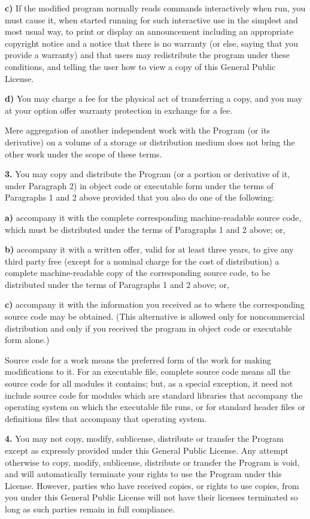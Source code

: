 \documentclass[]{article}
\begin{document}
\textbf{c)} If the modified program normally reads commands
interactively when run, you must cause it, when started running for such
interactive use in the simplest and most usual way, to print or display
an announcement including an appropriate copyright notice and a notice
that there is no warranty (or else, saying that you provide a warranty)
and that users may redistribute the program under these conditions, and
telling the user how to view a copy of this General Public License.

\textbf{d)} You may charge a fee for the physical act of transferring a
copy, and you may at your option offer warranty protection in exchange
for a fee.

Mere aggregation of another independent work with the Program (or its
derivative) on a volume of a storage or distribution medium does not
bring the other work under the scope of these terms.

\textbf{3.} You may copy and distribute the Program (or a portion or
derivative of it, under Paragraph 2) in object code or executable form
under the terms of Paragraphs 1 and 2 above provided that you also do
one of the following:

\textbf{a)} accompany it with the complete corresponding
machine-readable source code, which must be distributed under the terms
of Paragraphs 1 and 2 above; or,

\textbf{b)} accompany it with a written offer, valid for at least three
years, to give any third party free (except for a nominal charge for the
cost of distribution) a complete machine-readable copy of the
corresponding source code, to be distributed under the terms of
Paragraphs 1 and 2 above; or,

\textbf{c)} accompany it with the information you received as to where
the corresponding source code may be obtained. (This alternative is
allowed only for noncommercial distribution and only if you received the
program in object code or executable form alone.)

Source code for a work means the preferred form of the work for making
modifications to it. For an executable file, complete source code means
all the source code for all modules it contains; but, as a special
exception, it need not include source code for modules which are
standard libraries that accompany the operating system on which the
executable file runs, or for standard header files or definitions files
that accompany that operating system.

\textbf{4.} You may not copy, modify, sublicense, distribute or transfer
the Program except as expressly provided under this General Public
License. Any attempt otherwise to copy, modify, sublicense, distribute
or transfer the Program is void, and will automatically terminate your
rights to use the Program under this License. However, parties who have
received copies, or rights to use copies, from you under this General
Public License will not have their licenses terminated so long as such
parties remain in full compliance.
\end{document}
